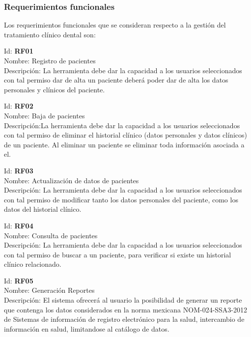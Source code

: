 \subsubsection{Requerimientos funcionales}

Los requerimientos funcionales que se consideran respecto a la gestión del tratamiento clínico dental son:

\vspace{1em}

\noindent Id:  \textbf{RF01}\\
Nombre: Registro de pacientes\\
Descripción: La herramienta debe dar la capacidad a los usuarios seleccionados con tal permiso dar de alta un paciente deberá poder dar de alta los datos personales y clínicos del paciente.

\vspace{1em}

\noindent Id:  \textbf{RF02}\\
Nombre: Baja de pacientes\\
Descripción:La herramienta debe dar la capacidad a los usuarios seleccionados con tal permiso de eliminar el historial clínico (datos personales y datos clínicos) de un paciente. Al eliminar un paciente se eliminar toda información asociada a el.

\vspace{1em}

\noindent Id:  \textbf{RF03}\\
Nombre: Actualización de datos de pacientes\\
Descripción: La herramienta debe dar la capacidad a los usuarios seleccionados con tal permiso de modificar tanto los datos personales del paciente, como los datos del historial clínico.

\vspace{1em}

\noindent Id:  \textbf{RF04}\\
Nombre: Consulta de pacientes\\
Descripción: La herramienta debe dar la capacidad a los usuarios seleccionados con tal permiso de buscar a un paciente, para verificar si existe un historial clínico relacionado.

\vspace{1em}

\noindent Id:  \textbf{RF05}\\
Nombre: Generación Reportes\\
Descripción: El sistema ofrecerá al usuario la posibilidad de generar un reporte que contenga los datos considerados en la
norma mexicana NOM-024-SSA3-2012 de Sistemas de información de registro electrónico para la salud, intercambio de información en salud, limitandose al catálogo de datos.

